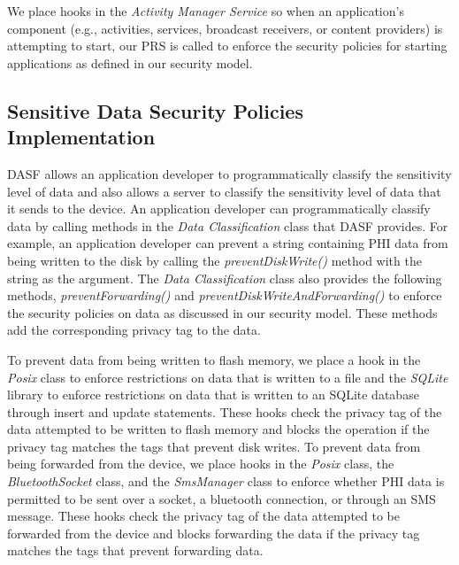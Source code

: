 We place hooks in the \textit{Activity Manager Service} so when 
an application's component (e.g., activities, services, broadcast receivers,
or content providers) is attempting to start, our PRS is called to
enforce the security policies for starting applications 
as defined in our security model.

\subsection{Sensitive Data Security Policies Implementation}  

DASF allows an application developer to programmatically
classify the sensitivity level of data and also allows a server
to classify the sensitivity level of data that it sends to the device.
An application developer can programmatically classify data by calling
methods in the \textit{Data Classification} class that DASF
provides. For example, an application developer can prevent a string
containing PHI data from being written to the disk by calling the
\textit{preventDiskWrite()} method with the string as the argument.
The \textit{Data Classification} class also provides the following
methods, \textit{preventForwarding()} and
\textit{preventDiskWriteAndForwarding()} to enforce the
security policies on data as discussed in our security model.
These methods add the corresponding privacy tag to the data.

To prevent data
from being written to flash memory, we place a hook in the \textit{Posix}
class to enforce restrictions on data that is written to a file and the
\textit{SQLite} library to enforce restrictions on data that is
written to an SQLite database through insert and update statements.
These hooks check the privacy tag of the data attempted to be written
to flash memory and blocks the operation if the privacy tag matches
the tags that prevent disk writes.  
To prevent data from being forwarded from the device, we place
hooks in the \textit{Posix} class, the \textit{BluetoothSocket} class,
and the \textit{SmsManager} class to enforce whether PHI data is
permitted to be sent over a socket, a bluetooth connection, or through
an SMS message. 
These hooks check the privacy tag of the data attempted to be forwarded
from the device and blocks forwarding the data if the privacy tag matches
the tags that prevent forwarding data.

